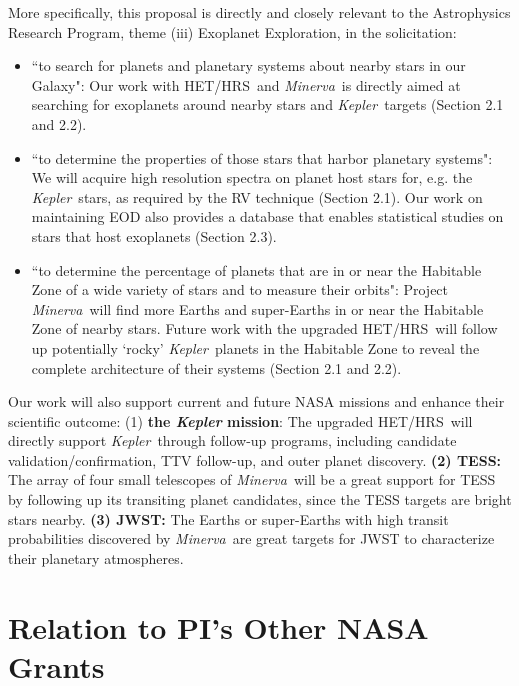 \documentclass[12pt]{article}
\def\kepler{{\it Kepler}}
\def\minerva{{\it Minerva}}
\def\hrs{HET/HRS}
\begin{document}
More specifically, this proposal is directly and closely relevant to
the Astrophysics Research Program, theme (iii) Exoplanet Exploration,
in the solicitation:
\begin{itemize}[leftmargin=1.5em]
  \vspace{-3pt}
\item ``to search for planets and planetary systems about
  nearby stars in our Galaxy": Our work with \hrs\ and
  \minerva\ is directly aimed at searching for exoplanets
  around nearby stars and \kepler\ targets (Section 2.1
  and 2.2).
  \vspace{-3pt}
\item ``to determine the properties of those stars that harbor
  planetary systems": We will acquire high resolution spectra
  on planet host stars for, e.g. the \kepler\ stars, as
  required by the RV technique (Section 2.1). Our work on
  maintaining EOD also provides a database that enables
  statistical studies on stars that host exoplanets (Section
  2.3).
  \vspace{-3pt}
\item ``to determine the percentage of planets that are in or near the
  Habitable Zone of a wide variety of stars and to measure their
  orbits": Project \minerva\ will find more Earths and super-Earths in
  or near the Habitable Zone of nearby stars. Future work with the
  upgraded \hrs\ will follow up potentially `rocky' \kepler\ planets
  in the Habitable Zone to reveal the complete architecture of their
  systems (Section 2.1 and 2.2).
  \vspace{-3pt}
\end{itemize}

Our work will also support current and future NASA missions and
enhance their scientific outcome: (1) {\bf the \textit{Kepler}
  mission}: The upgraded \hrs\ will directly support \kepler\ through
follow-up programs, including candidate validation/confirmation, TTV
follow-up, and outer planet discovery. {\bf (2) TESS:} The array of
four small telescopes of \minerva\ will be a great support for TESS by
following up its transiting planet candidates, since the TESS targets
are bright stars nearby. {\bf (3) JWST:} The Earths or super-Earths
with high transit probabilities discovered by \minerva\ are great
targets for JWST to characterize their planetary atmospheres.


\vspace{-3pt}
\section{Relation to PI's Other NASA Grants}
\end{document}
